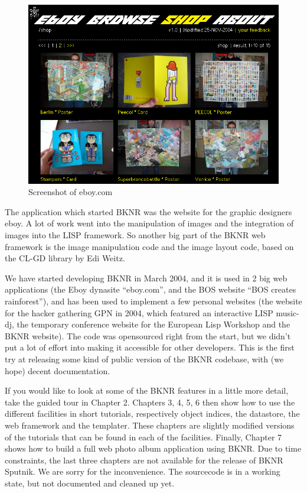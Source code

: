 \begin{figure}[htbp]
    \centering
\includegraphics[scale=0.4]{eboyshot1}
\caption{Screenshot of eboy.com}
\end{figure}

The application which started BKNR was the website for the graphic
designers eboy. A lot of work went into the manipulation of images and
the integration of images into the LISP framework. So another big part
of the BKNR web framework is the image manipulation code and the image
layout code, based on the CL-GD library by Edi Weitz.

We have started developing BKNR in March 2004, and it is used in 2 big
web applications (the Eboy dynasite ``eboy.com'', and the BOS website
``BOS creates rainforest''), and has been used to implement a few
personal websites (the website for the hacker gathering GPN in 2004,
which featured an interactive LISP music-dj, the temporary conference
website for the European Lisp Workshop and the BKNR website). The code
was opensourced right from the start, but we didn't put a lot of
effort into making it accessible for other developers. This is the
first try at releasing some kind of public version of the BKNR
codebase, with (we hope) decent documentation.

If you would like to look at some of the BKNR features in a little
more detail, take the guided tour in Chapter 2. Chapters 3, 4, 5, 6
then show how to use the different facilities in short tutorials,
respectively object indices, the datastore, the web framework and the
templater. These chapters are slightly modified versions of the
tutorials that can be found in each of the facilities. Finally,
Chapter 7 shows how to build a full web photo album application using
BKNR. Due to time constraints, the last three chapters are not
available for the release of BKNR Sputnik. We are sorry for the
inconvenience. The sourcecode is in a working state, but not
documented and cleaned up yet.

